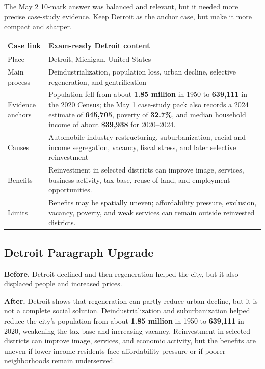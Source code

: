 \documentclass[11pt,a4paper]{article}
\newcommand{\term}[1]{\textcolor{HeadingBlue}{\textbf{#1}}}
\newcommand{\boxnote}[3]{%
\noindent\colorbox{#1}{%
  \begin{minipage}{0.965\textwidth}
  \sffamily
  \textbf{\textcolor{HeadingBlue}{#2}} #3
  \end{minipage}
}}
\begin{document}
The May 2 10-mark answer was balanced and relevant, but it needed more precise
case-study evidence. Keep Detroit as the anchor case, but make it more compact
and sharper.

\begin{tabularx}{\textwidth}{L{0.18\textwidth}Y}
\toprule
\textbf{Case link} & \textbf{Exam-ready Detroit content} \\
\midrule
Place & Detroit, Michigan, United States \\
Main process & Deindustrialization, population loss, urban decline, selective
regeneration, and gentrification \\
Evidence anchors & Population fell from about \term{1.85 million} in 1950 to
\term{639,111} in the 2020 Census; the May 1 case-study pack also records a
2024 estimate of \term{645,705}, poverty of \term{32.7\%}, and median household
income of about \term{\$39,938} for 2020--2024. \\
Causes & Automobile-industry restructuring, suburbanization, racial and income
segregation, vacancy, fiscal stress, and later selective reinvestment \\
Benefits & Reinvestment in selected districts can improve image, services,
business activity, tax base, reuse of land, and employment opportunities. \\
Limits & Benefits may be spatially uneven; affordability pressure, exclusion,
vacancy, poverty, and weak services can remain outside reinvested districts. \\
\bottomrule
\end{tabularx}

\subsection{Detroit Paragraph Upgrade}

\boxnote{SoftTint}{Before.}{Detroit declined and then regeneration helped the
city, but it also displaced people and increased prices.}

\boxnote{SoftGreen}{After.}{Detroit shows that regeneration can partly reduce
urban decline, but it is not a complete social solution. Deindustrialization
and suburbanization helped reduce the city's population from about \term{1.85
million} in 1950 to \term{639,111} in 2020, weakening the tax base and
increasing vacancy. Reinvestment in selected districts can improve image,
services, and economic activity, but the benefits are uneven if lower-income
residents face affordability pressure or if poorer neighborhoods remain
underserved.}
\end{document}
